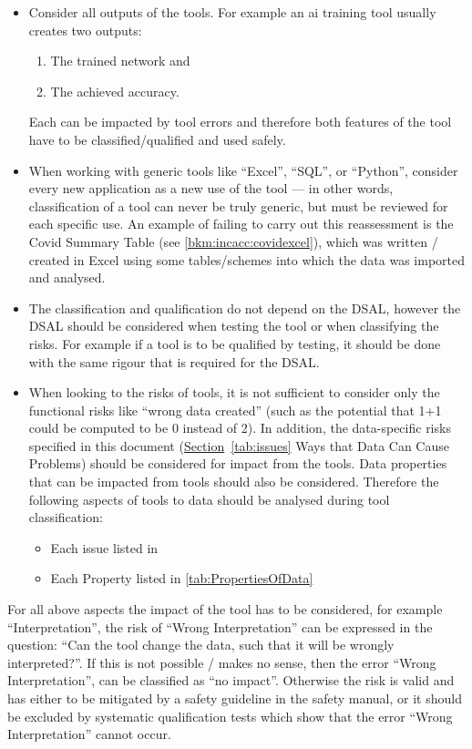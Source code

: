 \begin{itemize}
\item Consider all outputs of the tools.
  For example an \gls{ai} training tool usually creates two outputs:
  \begin{enumerate}
  \item The trained network and
  \item The achieved \gls{accuracy}.
  \end{enumerate}
  Each can be impacted by tool errors and therefore both features of the tool have to be classified/qualified  and used safely.
\item When working with generic tools like ``Excel'', ``SQL'', or ``Python'',
consider every new application as a new use of the tool --- in other words, classification of a tool can never be truly generic, but must be reviewed for each specific use. 
  An example of failing to carry out this reassessment is the Covid Summary Table (see \autoref{bkm:incacc:covidexcel}),
  which was written / created in Excel using some tables/schemes into which the data was imported and analysed.
\item The classification and qualification do not depend on the DSAL, however the DSAL should be considered when testing the tool or when classifying the risks.
  For example if a tool is to be qualified by testing, it should be done with the same rigour that is required  for the DSAL. 
\item When looking to the risks of tools, it is not sufficient to consider only the functional risks like ``wrong data created''
  (such as the potential that 1+1 could be computed to be 0 instead of 2).
  In addition, the data-specific risks specified in this document
  (\hyperref[tab:issues]{Section}~\ref{tab:issues} Ways that Data Can Cause  Problems) should be considered for impact from the tools.
  Data properties that can be impacted from tools should also be considered.
  Therefore the following aspects of tools to data should be analysed during tool classification:
  \begin{itemize}
  \item Each issue listed in 
  \item Each Property listed in \autoref{tab:PropertiesOfData}
  \end{itemize}    
\end{itemize}

For all above aspects the impact of the tool has to be considered, for example ``Interpretation'',
the risk of ``Wrong Interpretation'' can be expressed in the question:
``Can the tool change the data, such that it will be wrongly interpreted?''.
If this is not possible / makes no sense, then the error ``Wrong Interpretation'', can be classified as ``no impact''.
Otherwise the risk is valid and has either to be mitigated by a safety guideline in the safety manual,
or it should be excluded by systematic qualification  tests which show that the error ``Wrong Interpretation'' cannot occur.  
